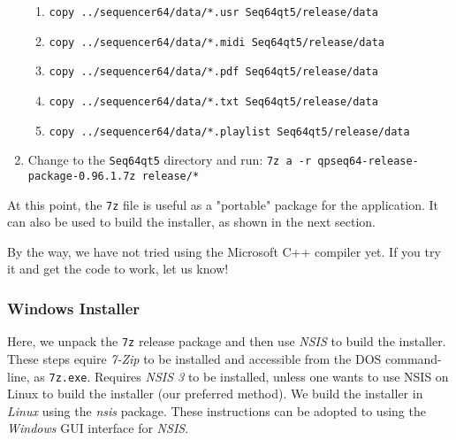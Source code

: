 \begin{enumerate}
\begin{enumerate}
            \item \texttt{copy ../sequencer64/data/*.usr Seq64qt5/release/data}
            \item \texttt{copy ../sequencer64/data/*.midi Seq64qt5/release/data}
            \item \texttt{copy ../sequencer64/data/*.pdf Seq64qt5/release/data}
            \item \texttt{copy ../sequencer64/data/*.txt Seq64qt5/release/data}
            \item \texttt{copy ../sequencer64/data/*.playlist Seq64qt5/release/data}
         \end{enumerate}
      \item Change to the \texttt{Seq64qt5} directory and run:
         \texttt{7z a -r qpseq64-release-package-0.96.1.7z \linebreak release/*}
   \end{enumerate}

   At this point, the \texttt{7z} file is useful as a "portable" package
   for the application.  It can also be used to build the installer, as
   shown in the next section.

   By the way, we have not tried using the Microsoft C++ compiler yet.
   If you try it and get the code to work, let us know!

\subsubsection{Windows Installer}
\label{subsec:seq64_build_installer_windows}

   Here, we unpack the \texttt{7z} release package and then use
   \textsl{NSIS} to build the installer.
   These steps equire \textsl{7-Zip}
   to be installed and accessible from the DOS
   command-line, as \texttt{7z.exe}.
   Requires \textsl{NSIS 3} to be installed, unless one wants to use
   NSIS on Linux to build the installer (our preferred method).
   We build the installer in \textsl{Linux} using the
   \textsl{nsis} package.  These instructions can be adopted to using the
   \textsl{Windows} GUI interface for \textsl{NSIS}.

